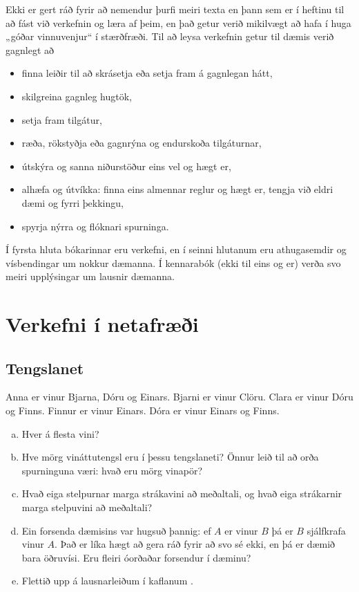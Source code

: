 \documentclass[b5paper,12pt]{book}
\begin{document}
\noindent
Ekki er gert ráð fyrir að nemendur þurfi meiri texta en þann sem er í heftinu til að fást við verkefnin og læra af þeim, en það getur verið mikilvægt að hafa í huga „góðar vinnuvenjur“ í stærðfræði. Til að leysa verkefnin getur til dæmis verið gagnlegt að 
\begin{itemize}
    \item finna leiðir til að skrásetja eða setja fram á gagnlegan hátt,
    \item skilgreina gagnleg hugtök,
    \item setja fram tilgátur, 
    \item ræða, rökstyðja eða gagnrýna og endurskoða tilgáturnar,
    \item útskýra og sanna niðurstöður eins vel og hægt er,
    \item alhæfa og útvíkka: finna eins almennar reglur og hægt er, tengja við eldri dæmi og fyrri þekkingu,
    \item spyrja nýrra og flóknari spurninga.
\end{itemize}

\noindent
Í fyrsta hluta bókarinnar eru verkefni, en í seinni hlutanum eru athugasemdir og vísbendingar um nokkur dæmanna. Í kennarabók (ekki til eins og er) verða svo meiri upplýsingar um lausnir dæmanna. 

\mainmatter
\pagestyle{plain}
\setcounter{page}{1}
\chapter*{Verkefni í netafræði} 
\section{Tengslanet}
\label{sec:fyrstanet}
Anna er vinur Bjarna, Dóru og Einars. Bjarni er vinur Clöru. Clara er vinur Dóru og Finns. Finnur er vinur Einars. Dóra er vinur Einars og Finns.
\begin{enumerate}[(a)]
    \item Hver á flesta vini?
    \item Hve mörg vináttutengsl eru í þessu tengslaneti? Önnur leið til að orða spurninguna væri: hvað eru mörg vinapör?
    \item Hvað eiga stelpurnar marga strákavini að meðaltali, og hvað eiga strákarnir marga stelpuvini að meðaltali?
    \item Ein forsenda dæmisins var hugsuð þannig: ef $A$ er vinur $B$ þá er $B$ sjálfkrafa vinur $A$. Það er líka hægt að gera ráð fyrir að svo sé ekki, en þá er dæmið bara öðruvísi. Eru fleiri óorðaðar forsendur í dæminu?
    \item Flettið upp á lausnarleiðum í kaflanum .
\end{enumerate}
\end{document}

